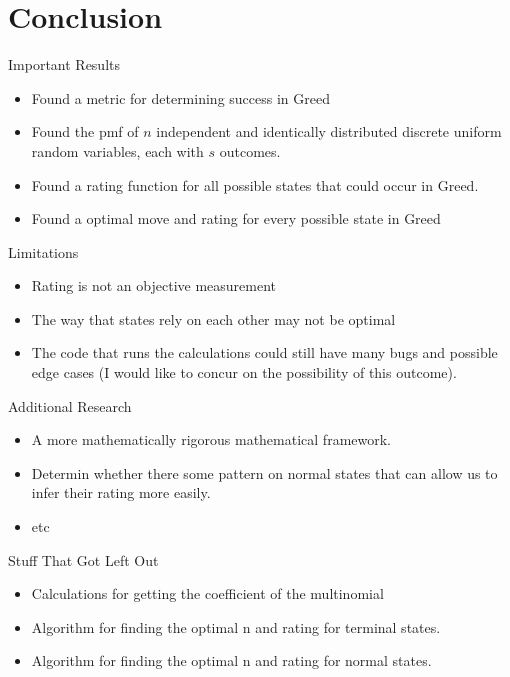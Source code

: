 \documentclass{beamer}
\begin{document}
\section{Conclusion}

\begin{frame}{Important Results}
    \begin{itemize}{}
        \item Found a metric for determining success in Greed
        \item Found the pmf of $n$ independent and identically distributed discrete uniform random variables, each with $s$ outcomes. 
        \item Found a rating function for all possible states that could occur in Greed.
        \item Found a optimal move and rating for every possible state in Greed
    \end{itemize}
\end{frame}

\begin{frame}{Limitations}
    \begin{itemize}{}
        \item Rating is not an objective measurement
        \item The way that states rely on each other may not be optimal
        \item The code that runs the calculations could still have many bugs and possible edge cases (I would like to concur on the possibility of this outcome).
    \end{itemize}
\end{frame}

\begin{frame}{Additional Research}
    \begin{itemize}{}
        \item A more mathematically rigorous mathematical framework.
        \item Determin whether there some pattern on normal states that can allow us to infer their rating more easily.
        \item etc
    \end{itemize}
\end{frame}

\begin{frame}{Stuff That Got Left Out}
    \begin{itemize}{}
        \item Calculations for getting the coefficient of the multinomial
        \item Algorithm for finding the optimal n and rating for terminal states.
        \item Algorithm for finding the optimal n and rating for normal states.
    \end{itemize}
\end{frame}
\end{document}
